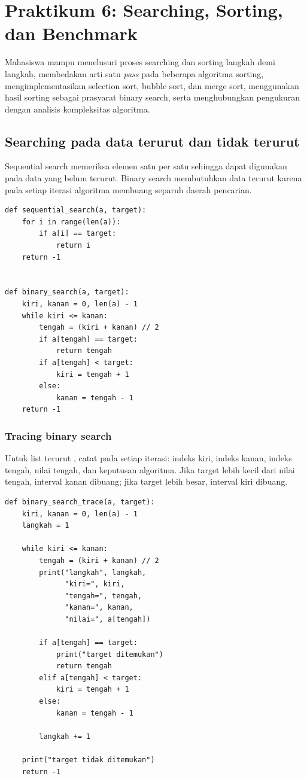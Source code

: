 \documentclass[11pt,a4paper]{report}
\newcommand{\kode}[1]{\texttt{\detokenize{#1}}}
\begin{document}
\chapter{Praktikum 6: Searching, Sorting, dan Benchmark}
\begin{tujuanbox}
Mahasiswa mampu menelusuri proses searching dan sorting langkah demi langkah, membedakan arti satu \textit{pass} pada beberapa algoritma sorting, mengimplementasikan selection sort, bubble sort, dan merge sort, menggunakan hasil sorting sebagai prasyarat binary search, serta menghubungkan pengukuran \kode{timeit} dengan analisis kompleksitas algoritma.
\end{tujuanbox}

\section{Searching pada data terurut dan tidak terurut}
Sequential search memeriksa elemen satu per satu sehingga dapat digunakan pada data yang belum terurut. Binary search membutuhkan data terurut karena pada setiap iterasi algoritma membuang separuh daerah pencarian.

\begin{lstlisting}
def sequential_search(a, target):
    for i in range(len(a)):
        if a[i] == target:
            return i
    return -1


def binary_search(a, target):
    kiri, kanan = 0, len(a) - 1
    while kiri <= kanan:
        tengah = (kiri + kanan) // 2
        if a[tengah] == target:
            return tengah
        if a[tengah] < target:
            kiri = tengah + 1
        else:
            kanan = tengah - 1
    return -1
\end{lstlisting}

\subsection{Tracing binary search}
Untuk list terurut \kode{[3,5,6,8,11,12,14,15,17,18]}, catat pada setiap iterasi: indeks kiri, indeks kanan, indeks tengah, nilai tengah, dan keputusan algoritma. Jika target lebih kecil dari nilai tengah, interval kanan dibuang; jika target lebih besar, interval kiri dibuang.

\begin{lstlisting}
def binary_search_trace(a, target):
    kiri, kanan = 0, len(a) - 1
    langkah = 1

    while kiri <= kanan:
        tengah = (kiri + kanan) // 2
        print("langkah", langkah,
              "kiri=", kiri,
              "tengah=", tengah,
              "kanan=", kanan,
              "nilai=", a[tengah])

        if a[tengah] == target:
            print("target ditemukan")
            return tengah
        elif a[tengah] < target:
            kiri = tengah + 1
        else:
            kanan = tengah - 1

        langkah += 1

    print("target tidak ditemukan")
    return -1
\end{lstlisting}
\end{document}
